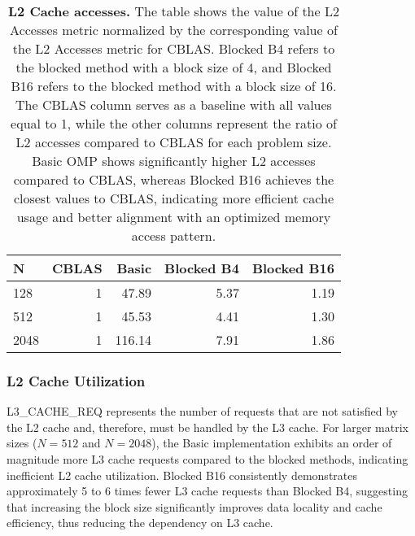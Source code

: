 \begin{table}[htbp]
    \centering
    \begin{tabular}{lrrrr}
    \toprule
    N &  CBLAS &  Basic &  Blocked B4 &  Blocked B16 \\
    \midrule
    128  &      1 &  47.89&       5.37&         1.19\\
    512  &      1 &  45.53&       4.41&         1.30\\
    2048 &      1 & 116.14&       7.91&         1.86\\
    \bottomrule
    \end{tabular}
    \caption{\textbf{L2 Cache accesses.} The table shows the value of the L2 Accesses metric normalized by the corresponding value of the L2 Accesses metric for CBLAS. Blocked B4 refers to the blocked method with a block size of 4, and Blocked B16 refers to the blocked method with a block size of 16. The CBLAS column serves as a baseline with all values equal to 1, while the other columns represent the ratio of L2 accesses compared to CBLAS for each problem size. Basic OMP shows significantly higher L2 accesses compared to CBLAS, whereas Blocked B16 achieves the closest values to CBLAS, indicating more efficient cache usage and better alignment with an optimized memory access pattern.}
    \label{tab:l2-cache}
\end{table}

\FloatBarrier
\subsubsection{L2 Cache Utilization}
\label{subsubsec:memory-hierarchy-utilization-l3}

L3\_CACHE\_REQ represents the number of requests that are not satisfied by the L2 cache and, therefore, must be handled by the L3 cache. For larger matrix sizes (\(N = 512\) and \(N = 2048\)), the Basic implementation exhibits an order of magnitude more L3 cache requests compared to the blocked methods, indicating inefficient L2 cache utilization. Blocked B16 consistently demonstrates approximately 5 to 6 times fewer L3 cache requests than Blocked B4, suggesting that increasing the block size significantly improves data locality and cache efficiency, thus reducing the dependency on L3 cache. 

